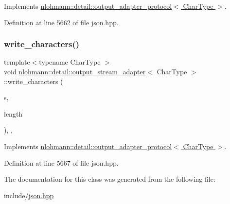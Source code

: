 Implements \hyperlink{structnlohmann_1_1detail_1_1output__adapter__protocol_a3381896fe1be557f591de2e917cdc7d5}{nlohmann\+::detail\+::output\+\_\+adapter\+\_\+protocol$<$ Char\+Type $>$}.



Definition at line 5662 of file json.\+hpp.

\mbox{\label{classnlohmann_1_1detail_1_1output__stream__adapter_ad61375497a7d03cb0bdcddfdaad185d0}} 
\subsubsection{\texorpdfstring{write\+\_\+characters()}{write\_characters()}}
{\footnotesize\ttfamily template$<$typename Char\+Type $>$ \\
void \hyperlink{classnlohmann_1_1detail_1_1output__stream__adapter}{nlohmann\+::detail\+::output\+\_\+stream\+\_\+adapter}$<$ Char\+Type $>$\+::write\+\_\+characters (\begin{DoxyParamCaption}\item[{const Char\+Type $\ast$}]{s,  }\item[{std\+::size\+\_\+t}]{length }\end{DoxyParamCaption})\hspace{0.3cm}{\ttfamily [inline]}, {\ttfamily [override]}, {\ttfamily [virtual]}}



Implements \hyperlink{structnlohmann_1_1detail_1_1output__adapter__protocol_a2f410a164e0eda17cf6561114b0eee4a}{nlohmann\+::detail\+::output\+\_\+adapter\+\_\+protocol$<$ Char\+Type $>$}.



Definition at line 5667 of file json.\+hpp.



The documentation for this class was generated from the following file\+:\begin{DoxyCompactItemize}
\item 
include/\hyperlink{json_8hpp}{json.\+hpp}\end{DoxyCompactItemize}

